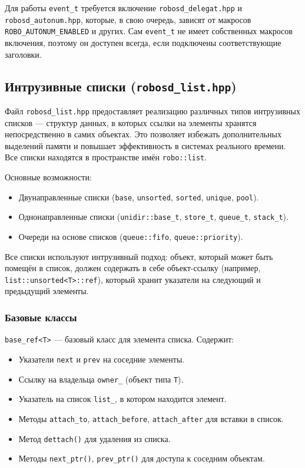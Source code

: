\documentclass[a4paper,12pt]{article}
\begin{document}
Для работы \texttt{event\_t} требуется включение \texttt{robosd\_delegat.hpp} и \texttt{robosd\_autonum.hpp}, которые, в свою очередь, зависят от макросов \texttt{ROBO\_AUTONUM\_ENABLED} и других. Сам \texttt{event\_t} не имеет собственных макросов включения, поэтому он доступен всегда, если подключены соответствующие заголовки.

\subsection{Интрузивные списки (\texttt{robosd\_list.hpp})}

Файл \texttt{robosd\_list.hpp} предоставляет реализацию различных типов интрузивных списков — структур данных, в которых ссылки на элементы хранятся непосредственно в самих объектах. Это позволяет избежать дополнительных выделений памяти и повышает эффективность в системах реального времени. Все списки находятся в пространстве имён \texttt{robo::list}.

Основные возможности:
\begin{itemize}
    \item Двунаправленные списки (\texttt{base}, \texttt{unsorted}, \texttt{sorted}, \texttt{unique}, \texttt{pool}).
    \item Однонаправленные списки (\texttt{unidir::base\_t}, \texttt{store\_t}, \texttt{queue\_t}, \texttt{stack\_t}).
    \item Очереди на основе списков (\texttt{queue::fifo}, \texttt{queue::priority}).
\end{itemize}

Все списки используют интрузивный подход: объект, который может быть помещён в список, должен содержать в себе объект-ссылку (например, \texttt{list::unsorted<T>::ref}), который хранит указатели на следующий и предыдущий элементы.

\subsubsection{Базовые классы}

\texttt{base\_ref<T>} — базовый класс для элемента списка. Содержит:
\begin{itemize}
    \item Указатели \texttt{next} и \texttt{prev} на соседние элементы.
    \item Ссылку на владельца \texttt{owner\_} (объект типа \texttt{T}).
    \item Указатель на список \texttt{list\_}, в котором находится элемент.
    \item Методы \texttt{attach\_to}, \texttt{attach\_before}, \texttt{attach\_after} для вставки в список.
    \item Метод \texttt{dettach()} для удаления из списка.
    \item Методы \texttt{next\_ptr()}, \texttt{prev\_ptr()} для доступа к соседним объектам.
\end{itemize}
\end{document}
